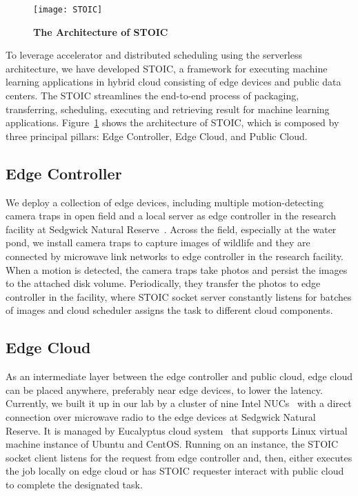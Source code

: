 \begin{figure}
    \centering
    \texttt{[image: STOIC]}
    \caption{\textbf{The Architecture of STOIC}}
    \label{fig:STOIC}
\end{figure}

To leverage accelerator and distributed scheduling using the serverless architecture, we have developed STOIC, a framework for executing machine learning applications in hybrid cloud consisting of edge devices and public data centers. The STOIC streamlines the end-to-end process of packaging, transferring, scheduling, executing and retrieving result for machine learning applications. Figure~\ref{fig:STOIC} shows the architecture of STOIC, which is composed by three principal pillars: Edge Controller, Edge Cloud, and Public Cloud.

\subsection{Edge Controller}
 We deploy a collection of edge devices, including multiple motion-detecting camera traps in open field and a local server as edge controller in the research facility at Sedgwick Natural Reserve~\cite{ref:sedgwick}. Across the field, especially at the water pond, we install camera traps to capture images of wildlife and they are connected by microwave link networks to edge controller in the research facility. When a motion is detected, the camera traps take photos and persist the images to the attached disk volume. Periodically, they transfer the photos to edge controller in the facility, where STOIC socket server constantly listens for batches of images and cloud scheduler assigns the task to different cloud components. 
 
 \subsection{Edge Cloud}
 
 As an intermediate layer between the edge controller and public cloud, edge cloud can be placed anywhere, preferably near edge devices, to lower the latency. Currently, we built it up in our lab by a cluster of nine Intel NUCs~\cite{ref:nucs} with a direct connection over microwave radio to the edge devices at Sedgwick Natural Reserve. It is managed by Eucalyptus cloud system~\cite{ref:euca} that supports Linux virtual machine instance of Ubuntu and CentOS. Running on an instance, the STOIC socket client listens for the request from edge controller and, then, either executes the job locally on edge cloud or has STOIC requester interact with public cloud to complete the designated task.
 
